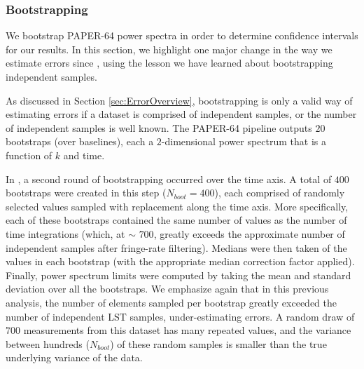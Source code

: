 \documentclass[preprint2,numberedappendix,tighten]{aastex6}  %
\begin{document}
\subsubsection{Bootstrapping}
\label{sec:Boot}

We bootstrap PAPER-64 power spectra in order to determine confidence intervals for our results. In this section, we highlight 
one major change in the way we estimate errors since , using the lesson we have learned about bootstrapping independent samples.

As discussed in Section \ref{sec:ErrorOverview}, bootstrapping is only a valid way of estimating errors if a dataset is comprised 
of independent samples, or the number of independent samples is well known. The PAPER-64 pipeline outputs $20$ bootstraps (over baselines), each a $2$-dimensional power 
spectrum that is a function of $k$ and time. 

In , a second round of bootstrapping occurred over the time axis. A total of $400$ bootstraps were created in this step 
($N_{boot} = 400$), each comprised of randomly selected values sampled with replacement along the time axis. More 
specifically, each of these bootstraps contained the same number of values as the number of time integrations (which, at $\sim$
$700$, greatly exceeds the approximate number of independent samples after fringe-rate filtering).
Medians were then taken of the values in each bootstrap (with the appropriate median correction factor applied). Finally, power 
spectrum limits were computed by taking the mean and standard deviation over all the bootstraps. We emphasize again that in 
this previous analysis, the number of elements sampled per bootstrap greatly 
exceeded the number of independent LST samples, under-estimating errors. A random draw of $700$ 
measurements from this dataset has many repeated values, and the variance between hundreds ($N_{boot}$) of these random 
samples is smaller than the true underlying variance of the data. 
\end{document}
